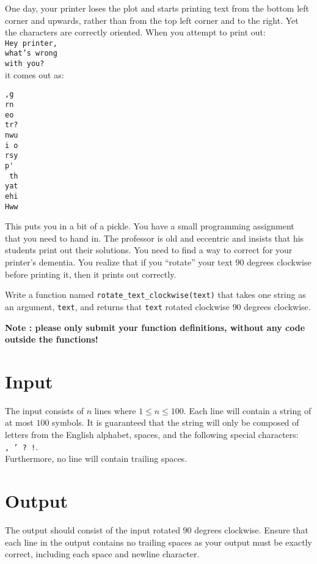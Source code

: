 

One day, your printer loses the plot and starts printing text from the bottom left corner and upwards,
rather than from the top left corner and to the right.
Yet the characters are correctly oriented. When you attempt to print out:\\
\texttt{Hey printer,}\\
\texttt{what's wrong}\\
\texttt{with you?}\\

\noindent
it comes out as:\\
\begin{verbatim}
,g 
rn 
eo 
tr?
nwu
i o
rsy
p'
 th
yat
ehi
Hww
\end{verbatim}

This puts you in a bit of a pickle. You have a small programming assignment that you need to hand in.
The professor is old and eccentric and insists that his students print out their solutions.
You need to find a way to correct for your printer's dementia.
You realize that if you ``rotate'' your text $90$ degrees clockwise before printing it,
then it prints out correctly.

Write a function named \texttt{rotate\_text\_clockwise(text)} that takes one string as an argument, 
\texttt{text}, and returns that \texttt{text} rotated clockwise $90$ degrees clockwise.

\textbf{Note : please only submit your function definitions, without any code outside the functions!}

\section*{Input}
The input consists of $n$ lines where $1 \leq n \leq 100$.
Each line will contain a string of at most $100$ symbols.
It is guaranteed that the string will only be composed of
letters from the English alphabet, spaces, and the following special characters:\\
\texttt{, ' ? !}.\\
Furthermore, no line will contain trailing spaces.

\section*{Output}
The output should consist of the input rotated $90$ degrees clockwise.
Ensure that each line in the output contains no trailing spaces
as your output must be exactly correct, including each space and newline character.
